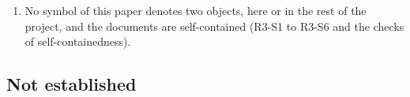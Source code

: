 \begin{enumerate}
$g'_{U2}f_{U2}$; massless $SU(2)_{U2}$ bosons; and the neutral scalar $\sigma_{U2}$ with
$m_{\sigma U2}=2|\Delta_{U2}|$ exactly in the vacuum without scalar coupling, a bound state below the
pair-breaking threshold when the fermions have a bare mass, whose propagator is the pairing
interaction of the broken phase. At finite density the stiffness obeys Leggett's theorem and the
Goldstone velocity is $7^{-1/2}$ at weak coupling (R3-M1 to R3-M12).
\item No symbol of this paper denotes two objects, here or in the rest of the project, and the
documents are self-contained (R3-S1 to R3-S6 and the checks of self-containedness).
\end{enumerate}

\subsection{Not established}

